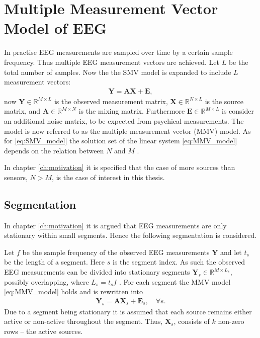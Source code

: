 \section{Multiple Measurement Vector Model of EEG}\label{sec:MMV}
In practise EEG measurements are sampled over time by a certain sample frequency. 
Thus multiple EEG measurement vectors are achieved.
Let $L$ be the total number of samples. Now the  
the SMV model is expanded to include $L$ measurement vectors:
\begin{align}\label{eq:MMV_model}
\mathbf{Y} = \mathbf{AX}+\textbf{E},
\end{align}
now $\mathbf{Y} \in \mathbb{R}^{M \times L}$ is the observed measurement matrix, $\mathbf{X} \in \mathbb{R}^{N \times L}$ is the source matrix, and $\mathbf{A} \in \mathbb{R}^{M \times N}$ is the mixing matrix. 
Furthermore $\textbf{E} \in \mathbb{R}^{M \times L}$ is consider an additional noise matrix, to be expected from psychical measurements.  
The model is now referred to as the multiple measurement vector (MMV) model.
As for \eqref{eq:SMV_model} the solution set of the linear system \eqref{eq:MMV_model} depends on the relation between $N$ and $M$ \cite[p. 42]{CS}. 

In chapter \ref{ch:motivation} it is specified that the case of more sources than sensors, $N>M$, is the case of interest in this thesis.  

\subsection{Segmentation}
In chapter \ref{ch:motivation} it is argued that EEG measurements are only stationary within small segments. 
Hence the following segmentation is considered.   

Let $f$ be the sample frequency of the observed EEG measurements $\mathbf{Y}$ and let $t_s$ be the length of a segment. 
Here $s$ is the segment index. 
As such the observed EEG measurements can be divided into stationary segments  $\mathbf{Y}_s \in \mathbb{R}^{M \times L_{s}}$, possibly overlapping, where $L_s = t_{s}f$ . 
For each segment the MMV model \eqref{eq:MMV_model} holds and is rewritten into
\begin{align}\label{eq:MMV_seg}
\mathbf{Y}_s = \mathbf{AX}_s + \textbf{E}_s, \quad \forall s.
\end{align}
Due to a segment being stationary it is assumed that each source remains either active or non-active throughout the segment.
Thus, $\mathbf{X}_s$, consists of $k$ non-zero rows -- the active sources.

